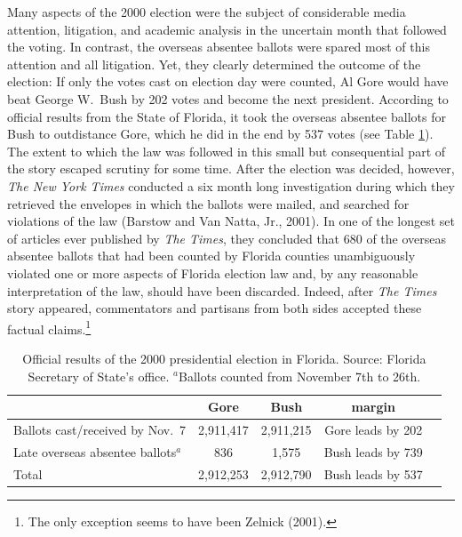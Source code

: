 \documentclass[11pt,titlepage]{article}
\begin{document}
Many aspects of the 2000 election were the subject of considerable
media attention, litigation, and academic analysis in the uncertain
month that followed the voting.
In contrast, the overseas absentee ballots were spared most of this
attention and all litigation.  Yet, they clearly determined the
outcome of the election: If only the votes cast on election day were
counted, Al Gore would have beat George W.\ Bush by 202 votes and
become the next president.  According to official results from the
State of Florida, it took the overseas absentee ballots for Bush to
outdistance Gore, which he did in the end by 537 votes (see Table
\ref{tb:official}).  The extent to which the law was followed in this
small but consequential part of the story escaped scrutiny for some
time. After the election was decided, however, \emph{The New York
  Times} conducted a six month long investigation during which they
retrieved the envelopes in which the ballots were mailed, and searched
for violations of the law (Barstow and Van Natta, Jr., 2001).  In one
of the longest set of articles ever published by \emph{The Times},
they concluded that 680 of the overseas absentee ballots that had been
counted by Florida counties unambiguously violated one or more aspects
of Florida election law and, by any reasonable interpretation of the
law, should have been discarded.  Indeed, after \emph{The Times} story
appeared, commentators and partisans from both sides accepted these
factual claims.\footnote{The only exception seems to have been Zelnick
  (2001)\nocite{Zelnick01}.}
\begin{table}[t]
\begin{center}
\begin{tabular}{lcccc}
                               & Gore      & Bush      & margin \\ \hline 
Ballots cast/received by Nov.\ 7&2,911,417 & 2,911,215 & Gore leads by 202 \\
Late overseas absentee ballots$^a$ &   836 &     1,575 & Bush leads by 739 \\
\hline
Total                          & 2,912,253 & 2,912,790 & Bush leads by 537 \\
\end{tabular} \caption{Official results of the 2000 presidential
  election in Florida.  Source: Florida Secretary of State's office.
  $^a$Ballots counted from November 7th to 26th.}
\label{tb:official}
\end{center}
\end{table} 
\end{document}
